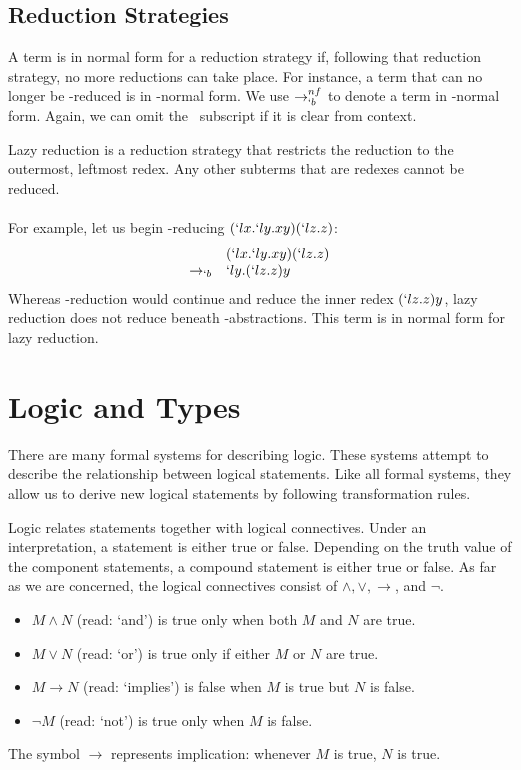   \subsection{Reduction Strategies}
 
  A term is in normal form for a reduction strategy if, 
    following that reduction strategy,
  no more reductions can take place.
  For instance, a term that can no longer be \bta-reduced is in \bta-normal form.
  We use $\to_{`b}^{nf}$ to denote a term in \bta-normal form.
  Again, we can omit the \bta\ subscript if it is clear from context.
  
  Lazy reduction is a reduction strategy that restricts the reduction to the outermost, leftmost redex.
  Any other subterms that are redexes cannot be reduced.
  \\  
  \\
  For example, let us begin \bta-reducing $(`lx.`ly.xy)(`lz.z)$: 
  \[
  \begin{array}{rll}
            & (`lx.`ly.xy)(`lz.z) \\
    \to_{`b}& `ly.(`lz.z)y
  \end{array}
  \]
  Whereas \bta-reduction would continue and reduce the inner redex $(`lz.z)y$,
  lazy reduction does not reduce beneath \lam-abstractions.
  This term is in normal form for lazy reduction.

\section{Logic and Types}

  There are many formal systems for describing logic.
  These systems attempt to describe the relationship between logical statements.
  Like all formal systems, 
  they allow us to derive new logical statements by following transformation rules.

  Logic relates statements together with logical connectives.
  Under an interpretation, a statement is either true or false.
  Depending on the truth value of the component statements, a compound statement is either true or false.
  As far as we are concerned, the logical connectives consist of $\land, \lor, \to$, and $\neg$.
  \begin{itemize}
    \item $M \land N$ (read: `and') is true only when both $M$ and $N$ are true.
    \item $M \lor N$ (read: `or') is true only if either $M$ or $N$ are true. 
    \item $M \to N$ (read: `implies') is false when $M$ is true but $N$ is false.
    \item $\neg M$ (read: `not') is true only when $M$ is false.
  \end{itemize}
  The symbol $\to$ represents implication: whenever $M$ is true, $N$ is true.
  
